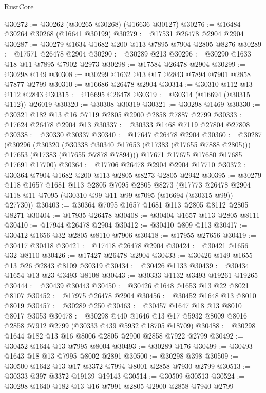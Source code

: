 \begin{lexlean}{RustCore}
\begin{coremodule}
@30272 := @30262 (@30265 @30268) (@16636 @30127)
@30276 := @16484 @30264 @30268 (@16641 @30199)
@30279 := @17531 @26478 @2904 @2904
@30287 := @30279 @1634 @1682 @200 @113 @7895 @7904 @2805 @8276
@30289 := @17571 @26478 @2904
@30290 := @30289 @213
@30296 := @30290 @1633 @18 @11 @7895 @7902 @2973
@30298 := @17584 @26478 @2904
@30299 := @30298 @149
@30308 := @30299 @1632 @13 @17 @2843 @7894 @7901 @2858 @7877 @2799
@30310 := @16686 @26478 @2904
@30314 := @30310 @112 @13 @112 @2843
@30315 := @16695 @26478
@30319 := @30314 (@16694 (@30315 @112)) @26019
@30320 := @30308 @30319
@30321 := @30298 @1469
@30330 := @30321 @182 @13 @16 @7119 @2805 @2900 @2858 @7887 @2799
@30333 := @17624 @26478 @2904 @13
@30337 := @30333 @1468 @7119 @27804 @27808
@30338 := @30330 @30337
@30340 := @17647 @26478 @2904
@30360 := @30287
    (@30296
      (@30320
        (@30338 @30340 @17653 (@17383 (@17655 @7888 @2805)))
        @17653
        (@17383 (@17655 @7878 @7894)))
      @17671
      @17675
      @17680
      @17685
      @17691
      @17700)
@30364 := @17706 @26478 @2904 @2904 @17710
@30372 := @30364 @7904 @1682 @200 @113 @2805 @8273 @2805 @2942
@30395 := @30279
    @118
    @1657
    @1681
    @113
    @2805
    @7095
    @2805
    @8273
    (@17773 @26478 @2904 @118 @11 @7095 (@30310 @99 @11 @99 @7095 (@16694 (@30315 @99)) @27730))
@30403 := @30364 @7095 @1657 @1681 @113 @2805 @8112 @2805 @8271
@30404 := @17935 @26478
@30408 := @30404 @1657 @113 @2805 @8111
@30410 := @17944 @26478 @2904
@30412 := @30410 @809 @113
@30417 := @30412 @1656 @32 @2805 @8110 @7906
@30418 := @17955 @27656
@30419 := @30417 @30418
@30421 := @17418 @26478 @2904
@30424 := @30421 @1656 @32 @8110
@30426 := @17427 @26478 @2904
@30433 := @30426 @149 @1655 @13 @26 @2843 @8109 @30319
@30434 := @30426 @1133
@30439 := @30434 @1654 @13 @23 @3493 @8108
@30443 := @30333 @1132 @3493 @19261 @19265
@30444 := @30439 @30443
@30450 := @30426 @1648 @1653 @13 @22 @8021 @8107
@30452 := @17975 @26478 @2904
@30456 := @30452 @1648 @13 @8010 @8019
@30457 := @30289 @250
@30463 := @30457 @1647 @18 @13 @8010 @8017 @3053
@30478 := @30298
    @440
    @1646
    @13
    @17
    @5932
    @8009
    @8016
    @2858
    @7912
    @2799
    (@30333 @439 @5932 @18705 @18709)
@30488 := @30298 @1644 @182 @13 @16 @8006 @2805 @2900 @2858 @7922 @2799
@30492 := @30452 @1644 @13 @7995 @8004
@30493 := @30289 @176
@30499 := @30493 @1643 @18 @13 @7995 @8002 @2891
@30500 := @30298 @398
@30509 := @30500 @1642 @13 @17 @3372 @7994 @8001 @2858 @7930 @2799
@30513 := @30333 @397 @3372 @19139 @19143
@30514 := @30509 @30513
@30524 := @30298 @1640 @182 @13 @16 @7991 @2805 @2900 @2858 @7940 @2799

\end{coremodule}
\end{lexlean}

